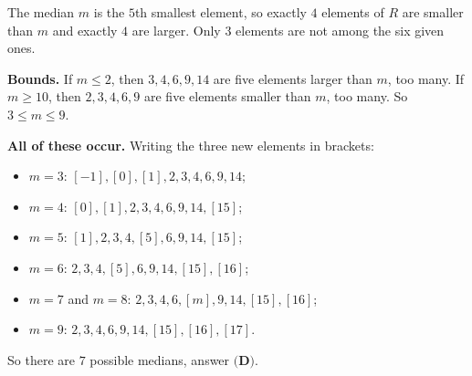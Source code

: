 The median $m$ is the $5$th smallest element, so exactly $4$ elements of $R$ are smaller than $m$ and exactly $4$ are larger. Only $3$ elements are not among the six given ones.

\textbf{Bounds.} If $m\le2$, then $3,4,6,9,14$ are five elements larger than $m$, too many. If $m\ge10$, then $2,3,4,6,9$ are five elements smaller than $m$, too many. So $3\le m\le9$.

\textbf{All of these occur.} Writing the three new elements in brackets:
\begin{itemize}
\item $m=3$: $[-1],[0],[1],2,3,4,6,9,14$;
\item $m=4$: $[0],[1],2,3,4,6,9,14,[15]$;
\item $m=5$: $[1],2,3,4,[5],6,9,14,[15]$;
\item $m=6$: $2,3,4,[5],6,9,14,[15],[16]$;
\item $m=7$ and $m=8$: $2,3,4,6,[m],9,14,[15],[16]$;
\item $m=9$: $2,3,4,6,9,14,[15],[16],[17]$.
\end{itemize}
So there are $\boxed{7}$ possible medians, answer $\textbf{(D)}$.
